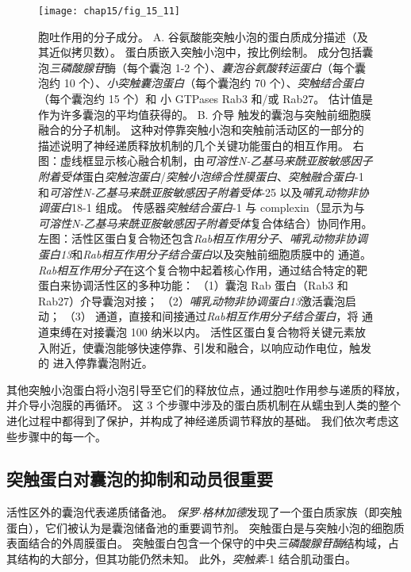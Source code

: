 \begin{figure}[htbp]
	\centering
	\texttt{[image: chap15/fig\_15\_11]}
	\caption{胞吐作用的分子成分。
		A. 谷氨酸能突触小泡的蛋白质成分描述（及其近似拷贝数）。
		蛋白质嵌入突触小泡中，按比例绘制。
		成分包括囊泡\textit{三磷酸腺苷}酶（每个囊泡 1-2 个）、\textit{囊泡谷氨酸转运蛋白}（每个囊泡约 10 个）、\textit{小突触囊泡蛋白}（每个囊泡约 70 个）、\textit{突触结合蛋白}（每个囊泡约 15 个）和 小 GTPases Rab3 和/或 Rab27。
		估计值是作为许多囊泡的平均值获得的\cite{takamori2006molecular}。
		B. 介导  触发的囊泡与突触前细胞膜融合的分子机制。
		这种对停靠突触小泡和突触前活动区的一部分的描述说明了神经递质释放机制的几个关键功能蛋白的相互作用。
		右图：虚线框显示核心融合机制，由\textit{可溶性N-乙基马来酰亚胺敏感因子附着受体}蛋白\textit{突触泡蛋白}/\textit{突触小泡缔合性膜蛋白}、\textit{突触融合蛋白}-1 和\textit{可溶性N-乙基马来酰亚胺敏感因子附着受体}-25 以及\textit{哺乳动物非协调蛋白}18-1 组成。
		 传感器\textit{突触结合蛋白}-1 与 complexin（显示为与\textit{可溶性N-乙基马来酰亚胺敏感因子附着受体}复合体结合）协同作用。
		左图：活性区蛋白复合物还包含\textit{Rab相互作用分子}、\textit{哺乳动物非协调蛋白13}和\textit{Rab相互作用分子结合蛋白}以及突触前细胞质膜中的  通道。
		\textit{Rab相互作用分子}在这个复合物中起着核心作用，通过结合特定的靶蛋白来协调活性区的多种功能：
		（1）囊泡 Rab 蛋白（Rab3 和 Rab27）介导囊泡对接；
		（2）\textit{哺乳动物非协调蛋白13}激活囊泡启动；
		（3） 通道，直接和间接通过\textit{Rab相互作用分子结合蛋白}，将  通道束缚在对接囊泡 100 纳米以内。
		活性区蛋白复合物将关键元素放入附近，使囊泡能够快速停靠、引发和融合，以响应动作电位，触发的 进入停靠囊泡附近\cite{sudhof2013neurotransmitter}。}
	\label{fig:15_11}
\end{figure}


其他突触小泡蛋白将小泡引导至它们的释放位点，通过胞吐作用参与递质的释放，并介导小泡膜的再循环。
这 3 个步骤中涉及的蛋白质机制在从蠕虫到人类的整个进化过程中都得到了保护，并构成了神经递质调节释放的基础。
我们依次考虑这些步骤中的每一个。



\subsection{突触蛋白对囊泡的抑制和动员很重要}

活性区外的囊泡代表递质储备池。
\textit{保罗$\cdot$格林加德}发现了一个蛋白质家族（即突触蛋白），它们被认为是囊泡储备池的重要调节剂。
突触蛋白是与突触小泡的细胞质表面结合的外周膜蛋白。
突触蛋白包含一个保守的中央\textit{三磷酸腺苷酶}结构域，占其结构的大部分，但其功能仍然未知。
此外，\textit{突触素}-1 结合肌动蛋白。


